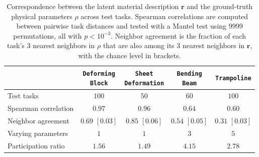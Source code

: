 \begin{table}[t]
    \centering
    \caption{Correspondence between the latent material description $\mathbf{r}$ and the ground-truth physical parameters $\rho$ across test tasks. Spearman correlations are computed between pairwise task distances and tested with a Mantel test using $9999$ permutations, all with $p < 10^{-3}$. Neighbor agreement is the fraction of each task's $3$ nearest neighbors in $\rho$ that are also among its $3$ nearest neighbors in $\mathbf{r}$, with the chance level in brackets.}
    \label{tab:rsa}
    \begin{tabular}{lcccc}
    \toprule
     & \shortstack{\texttt{Deforming}\\\texttt{Block}} & \shortstack{\texttt{Sheet}\\\texttt{Deformation}} & \shortstack{\texttt{Bending}\\\texttt{Beam}} & \texttt{Trampoline} \\
    \midrule
    Test tasks & $100$ & $50$ & $60$ & $100$ \\
    Spearman correlation & $0.97$ & $0.96$ & $0.64$ & $0.60$ \\
    Neighbor agreement & $0.69$ \small{$[0.03]$} & $0.85$ \small{$[0.06]$} & $0.54$ \small{$[0.05]$} & $0.31$ \small{$[0.03]$} \\
    Varying parameters & $1$ & $1$ & $3$ & $5$ \\
    Participation ratio & $1.56$ & $1.49$ & $4.15$ & $2.78$ \\
    \bottomrule
    \end{tabular}
\end{table}